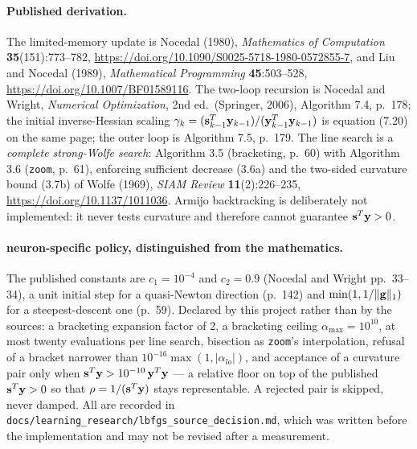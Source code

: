 \paragraph{Published derivation.}  The limited-memory update is Nocedal
(1980), \emph{Mathematics of Computation} \textbf{35}(151):773--782,
\url{https://doi.org/10.1090/S0025-5718-1980-0572855-7}, and Liu and
Nocedal (1989), \emph{Mathematical Programming} \textbf{45}:503--528,
\url{https://doi.org/10.1007/BF01589116}.  The
two-loop recursion is Nocedal and Wright, \emph{Numerical Optimization}, 2nd
ed.\ (Springer, 2006), Algorithm 7.4, p.~178; the initial inverse-Hessian
scaling $\gamma_k = ({\bf s}_{k-1}^T{\bf y}_{k-1}) /
({\bf y}_{k-1}^T{\bf y}_{k-1})$ is equation (7.20) on the same page; the outer
loop is Algorithm 7.5, p.~179.  The line search is a \emph{complete strong-Wolfe
search}: Algorithm 3.5 (bracketing, p.~60) with Algorithm 3.6 (\texttt{zoom},
p.~61), enforcing sufficient decrease (3.6a) and the two-sided curvature bound
(3.7b) of Wolfe (1969), \emph{SIAM Review} \textbf{11}(2):226--235,
\url{https://doi.org/10.1137/1011036}.  Armijo
backtracking is deliberately not implemented: it never tests curvature and
therefore cannot guarantee ${\bf s}^T{\bf y} > 0$.

\paragraph{neuron-specific policy, distinguished from the mathematics.}  The
published constants are $c_1 = 10^{-4}$ and $c_2 = 0.9$ (Nocedal and Wright
pp.~33--34), a unit initial step for a quasi-Newton direction (p.~142) and
$\min(1, 1/\|{\bf g}\|_1)$ for a steepest-descent one (p.~59).  Declared by
this project rather than by the sources: a bracketing expansion factor of $2$, a
bracketing ceiling $\alpha_{\max} = 10^{10}$, at most twenty evaluations per
line search, bisection as \texttt{zoom}'s interpolation, refusal of a bracket
narrower than $10^{-16}\max(1,|\alpha_{lo}|)$, and acceptance of a curvature
pair only when ${\bf s}^T{\bf y} > 10^{-10}\,{\bf y}^T{\bf y}$ --- a relative
floor on top of the published ${\bf s}^T{\bf y} > 0$ so that $\rho = 1/
({\bf s}^T{\bf y})$ stays representable.  A rejected pair is skipped, never
damped.  All are recorded in
\texttt{docs/learning\_research/lbfgs\_source\_decision.md}, which was written
before the implementation and may not be revised after a measurement.


